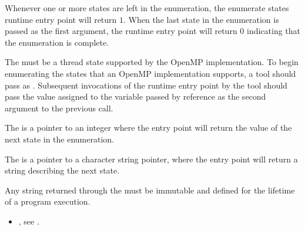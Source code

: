 Whenever one or more states are left in the enumeration, 
the enumerate states runtime entry point will return $1$.
When the last state in the enumeration is passed 
as the first argument, the runtime entry point will return $0$ 
indicating that the enumeration is complete.



\argdesc

The \callbackarg{}  must be a thread state
supported by the OpenMP implementation.  To begin enumerating the
states that an OpenMP implementation supports, a tool should pass
 as .  Subsequent
invocations of the runtime entry point by the tool should pass the
value assigned to the variable passed by reference as the second
argument to the previous call.

The \callbackarg{}  is a pointer to an integer where
the entry point will return the value of the next state in the
enumeration. 

The \callbackarg{}  is a pointer to a 
character string pointer, where the entry point will return a string
describing the next state.

\constraints
Any string returned through the \callbackarg{}
 must be immutable and defined 
for the lifetime of a program execution.

\vspace{2ex}


\crossreferences
\begin{itemize}
\item {}, see .
\end{itemize}

